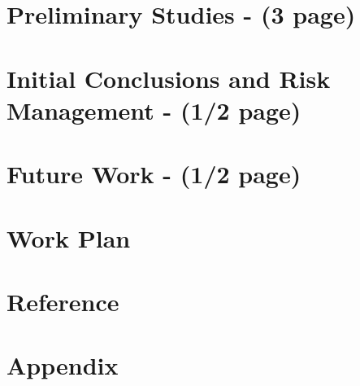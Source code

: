 \documentclass{article}
\begin{document}
\section{Preliminary Studies - (3 page)}

\section{Initial Conclusions and Risk Management - (1/2 page)}

\section{Future Work - (1/2 page)}

\section{Work Plan}

\section*{Reference}


\section*{Appendix}
\end{document}
